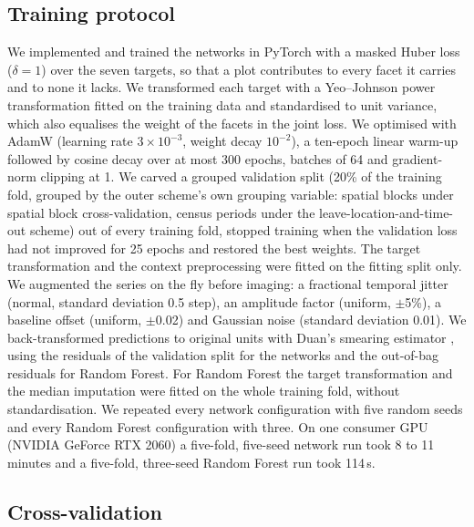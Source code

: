 \documentclass[preprint,12pt]{elsarticle}
\begin{document}
\subsection{Training protocol}
\label{sec:training}

We implemented and trained the networks in PyTorch \citep{paszke2019pytorch} with a
masked Huber loss \citep{huber1964robust} ($\delta = 1$)
over the seven targets, so that a plot contributes to every facet it carries and to none it
lacks. We transformed each target with a Yeo--Johnson power transformation
\citep{yeo2000new} fitted on the training data and standardised to unit variance, which
also equalises the weight of the facets in the joint loss. We optimised with AdamW
\citep{loshchilov2019decoupled} (learning rate $3 \times 10^{-3}$, weight decay
$10^{-2}$), a ten-epoch linear warm-up followed by cosine decay over at most 300 epochs,
batches of 64 and gradient-norm clipping at 1. We carved a grouped validation split (20\%
of the training fold, grouped by the outer scheme's own grouping variable: spatial blocks
under spatial block cross-validation, census periods under the leave-location-and-time-out
scheme) out of every training fold, stopped training when the validation loss had not improved for 25 epochs
and restored the best weights. The target transformation and the context preprocessing
were fitted on the fitting split only. We augmented the series on the fly before imaging:
a fractional temporal jitter (normal, standard deviation 0.5 step), an amplitude factor
(uniform, $\pm$5\%), a baseline offset (uniform, $\pm$0.02) and Gaussian noise (standard
deviation 0.01). We back-transformed predictions to original units with Duan's smearing
estimator \citep{duan1983smearing}, using the residuals of the validation split for the
networks and the out-of-bag residuals for Random Forest. For Random Forest the target
transformation and the median imputation were fitted on the whole training fold, without
standardisation. We repeated every network configuration with five random seeds and every
Random Forest configuration with three. On one consumer GPU (NVIDIA GeForce RTX 2060) a
five-fold, five-seed network run took 8 to 11 minutes and a five-fold, three-seed Random
Forest run took 114\,s.

\subsection{Cross-validation}
\label{sec:cv}
\end{document}
